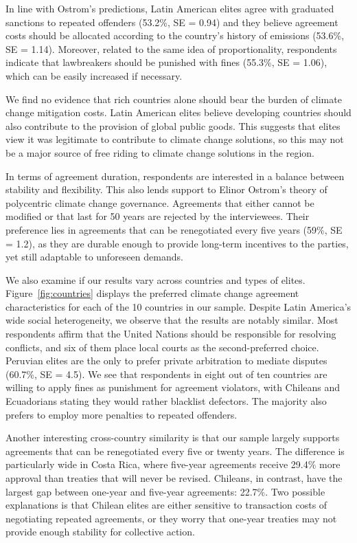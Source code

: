 \documentclass[a4paper,12pt]{article}
\begin{document}
In line with Ostrom's predictions, Latin American elites agree with graduated sanctions to repeated offenders (53.2\%, SE = 0.94) and they believe agreement costs should be allocated according to the country's history of emissions (53.6\%, SE = 1.14). Moreover, related to the same idea of proportionality, respondents indicate that lawbreakers should be punished with fines (55.3\%, SE = 1.06), which can be easily increased if necessary.

We find no evidence that rich countries alone should bear the burden of climate change mitigation costs. Latin American elites believe developing countries should also contribute to the provision of global public goods. This suggests that elites view it was legitimate to contribute to climate change solutions, so this may not be a major source of free riding to climate change solutions in the region.

In terms of agreement duration, respondents are interested in a balance between stability and flexibility. This also lends support to Elinor Ostrom's theory of polycentric climate change governance. Agreements that either cannot be modified or that last for 50 years are rejected by the interviewees. Their preference lies in agreements that can be renegotiated every five years (59\%, SE = 1.2), as they are durable enough to provide long-term incentives to the parties, yet still adaptable to unforeseen demands.

We also examine if our results vary across countries and types of elites. Figure~\ref{fig:countries} displays the preferred climate change agreement characteristics for each of the 10 countries in our sample. Despite Latin America's wide social heterogeneity, we observe that the results are notably similar. Most respondents affirm that the United Nations should be responsible for resolving conflicts, and six of them place local courts as the second-preferred choice. Peruvian elites are the only to prefer private arbitration to mediate disputes (60.7\%, SE = 4.5). We see that respondents in eight out of ten countries are willing to apply fines as punishment for agreement violators, with Chileans and Ecuadorians stating they would rather blacklist defectors. The majority also prefers to employ more penalties to repeated offenders. 

Another interesting cross-country similarity is that our sample largely supports agreements that can be renegotiated every five or twenty years. The difference is particularly wide in Costa Rica, where five-year agreements receive 29.4\% more approval than treaties that will never be revised. Chileans, in contrast, have the largest gap between one-year and five-year agreements: 22.7\%. Two possible explanations is that Chilean elites are either sensitive to transaction costs of negotiating repeated agreements, or they worry that one-year treaties may not provide enough stability for collective action.
\end{document}
